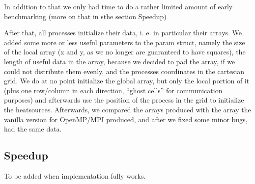 In addition to that we only had time to do a rather limited amount of early benchmarking (more on that in sthe section Speedup)

After that, all processes initialize their data, i. e. in particular their arrays. We added some more or less useful parameters to the param struct, namely the size of the local array (x and y, as we no longer are guaranteed to have squares), the length of useful data in the array, because we decided to pad the array, if we could not distribute them evenly, and the processes coordinates in the cartesian grid. We do at no point initialize the global array, but only the local portion of it (plus one row/column in each direction, ``ghost cells'' for communication purposes) and afterwards use the position of the process in the grid to initialize the heatsources. 
Afterwards, we compared the arrays produced with the array the vanilla version for OpenMP/MPI produced, and after we fixed some minor bugs, had the same data.





\subsection*{Speedup}

To be added when implementation fully works.
